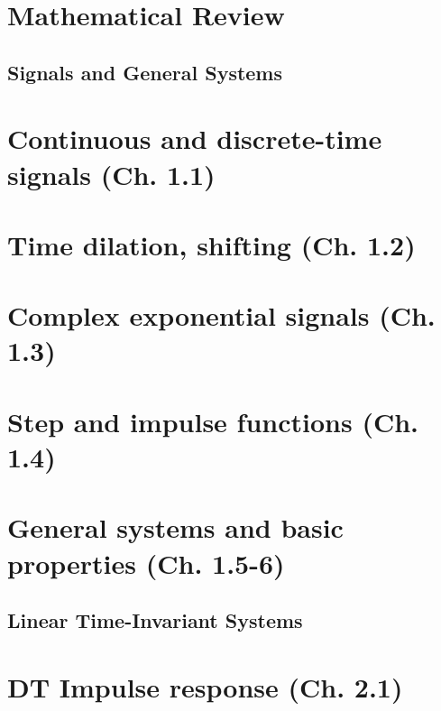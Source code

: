 \documentclass{article}
\begin{document}
\section{Mathematical Review}

\newpage

\begin{center}
    \section*{Signals and General Systems}
\end{center}
\section{Continuous and discrete-time signals (Ch. 1.1)}

\newpage

\section{Time dilation, shifting (Ch. 1.2)}

\newpage

\section{Complex exponential signals (Ch. 1.3)}

\newpage

\section{Step and impulse functions (Ch. 1.4)}

\newpage

\section{General systems and basic properties (Ch. 1.5-6)}

\newpage

\begin{center}
    \section*{Linear Time-Invariant Systems}
\end{center}
\section{DT Impulse response (Ch. 2.1)}

\newpage
\end{document}
